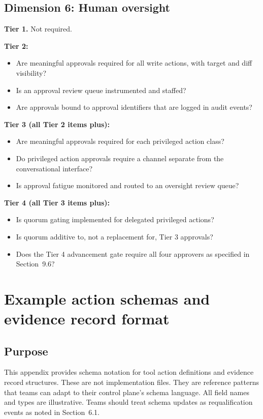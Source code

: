\documentclass[11pt]{article}
\begin{document}
\subsection{Dimension 6: Human oversight}

\textbf{Tier 1.} Not required.

\textbf{Tier 2:}
\begin{itemize}
  \item Are meaningful approvals required for all write actions, with target and diff visibility?
  \item Is an approval review queue instrumented and staffed?
  \item Are approvals bound to approval identifiers that are logged in audit events?
\end{itemize}

\textbf{Tier 3 (all Tier 2 items plus):}
\begin{itemize}
  \item Are meaningful approvals required for each privileged action class?
  \item Do privileged action approvals require a channel separate from the conversational interface?
  \item Is approval fatigue monitored and routed to an oversight review queue?
\end{itemize}

\textbf{Tier 4 (all Tier 3 items plus):}
\begin{itemize}
  \item Is quorum gating implemented for delegated privileged actions?
  \item Is quorum additive to, not a replacement for, Tier 3 approvals?
  \item Does the Tier 4 advancement gate require all four approvers as specified in Section~9.6?
\end{itemize}

\section{Example action schemas and evidence record format}

\subsection{Purpose}
This appendix provides schema notation for tool action definitions and evidence record structures. These are not implementation files. They are reference patterns that teams can adapt to their control plane's schema language. All field names and types are illustrative. Teams should treat schema updates as requalification events as noted in Section~6.1.
\end{document}
